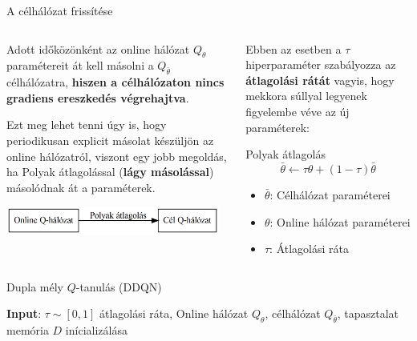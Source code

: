 \documentclass[english, aspectratio=169]{beamer}
\begin{document}
\begin{frame}{A célhálózat frissítése}
\begin{columns}
\begin{column}{.5\textwidth}
Adott időközönként az online hálózat $Q_\theta$ paramétereit át kell másolni a $Q_{\bar{\theta}}$ célhálózatra, \textbf{hiszen a célhálózaton nincs gradiens ereszkedés végrehajtva}.\par\smallskip
Ezt meg lehet tenni úgy is, hogy periodikusan explicit másolat készüljön az online hálózatról, viszont egy jobb megoldás, ha Polyak átlagolással (\textbf{lágy másolással}) másolódnak át a paraméterek.\par\smallskip
\begin{center}
\includegraphics[width=7cm, keepaspectratio]{graphs/dql_4.png}
\end{center}
\end{column}
\begin{column}{.5\textwidth}
Ebben az esetben a $\tau$ hiperparaméter szabályozza az \textbf{átlagolási rátát} vagyis, hogy mekkora súllyal legyenek figyelembe véve az új paraméterek:
\begin{block}{Polyak átlagolás}
\[
\bar{\theta} \leftarrow \tau \theta + (1 - \tau) \bar{\theta}
\]
\begin{itemize}
	\item $\bar{\theta}$: Célhálózat paraméterei
	\item $\theta$: Online hálózat paraméterei
	\item $\tau$: Átlagolási ráta
\end{itemize}
\end{block}
\end{column}
\end{columns}
\end{frame}

\begin{frame}{}
\begin{algorithm}[H]
\caption{Dupla mély $Q$-tanulás (DDQN)}
\SetAlgoLined
\textbf{Input}: $\tau \sim [0,1]$ átlagolási ráta,
Online hálózat $Q_\theta$, célhálózat $Q_{\bar{\theta}}$, tapasztalat memória $D$ inícializálása\;
\end{algorithm}
\end{frame}
\end{document}
